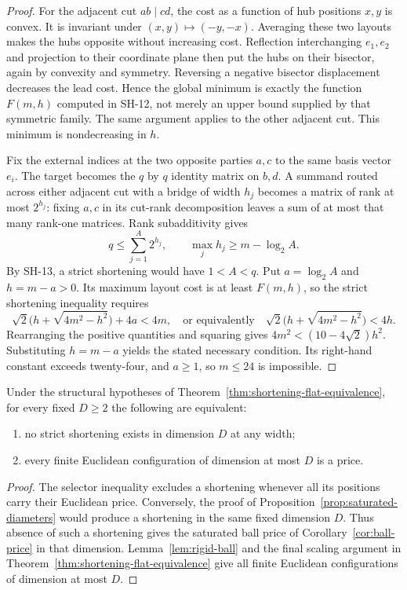 \begin{proof}
For the adjacent cut $ab\mid cd$, the cost as a function of hub
positions $x,y$ is convex.  It is invariant under
$(x,y)\mapsto(-y,-x)$.  Averaging these two layouts makes the hubs
opposite without increasing cost.  Reflection interchanging $e_1,e_2$
and projection to their coordinate plane then put the hubs on their
bisector, again by convexity and symmetry.  Reversing a negative
bisector displacement decreases the lead cost.  Hence the global
minimum is exactly the function $F(m,h)$ computed in SH-12, not merely
an upper bound supplied by that symmetric family.  The same argument
applies to the other adjacent cut.  This minimum is nondecreasing in
$h$.

Fix the external indices at the two opposite parties $a,c$ to the
same basis vector $e_i$.  The target becomes the $q$ by $q$ identity
matrix on $b,d$.  A summand routed across either adjacent cut with a
bridge of width $h_j$ becomes a matrix of rank at most $2^{h_j}$:
fixing $a,c$ in its cut-rank decomposition leaves a sum of at most
that many rank-one matrices.  Rank subadditivity gives
\[
 q\le\sum_{j=1}^A2^{h_j},\qquad
 \max_j h_j\ge m-\log_2 A.
\]
By SH-13, a strict shortening would have $1<A<q$.  Put
$a=\log_2 A$ and $h=m-a>0$.  Its maximum layout cost is at least
$F(m,h)$, so the strict shortening inequality requires
\[
 \sqrt2\bigl(h+\sqrt{4m^2-h^2}\bigr)+4a<4m,
 \quad\text{or equivalently}\quad
 \sqrt2\bigl(h+\sqrt{4m^2-h^2}\bigr)<4h.
\]
Rearranging the positive quantities and squaring gives
$4m^2<(10-4\sqrt2)h^2$.  Substituting $h=m-a$ yields the stated
necessary condition.  Its right-hand constant exceeds twenty-four,
and $a\ge1$, so $m\le24$ is impossible.
\end{proof}

\begin{corollary}
\label{cor:fixed-dimension}
Under the structural hypotheses of Theorem~\ref{thm:shortening-flat-equivalence},
for every fixed $D\ge2$ the following are equivalent:
\begin{enumerate}
\item no strict shortening exists in dimension $D$ at any width;
\item every finite Euclidean configuration of dimension at most $D$
is a price.
\end{enumerate}
\end{corollary}
\begin{proof}
The selector inequality excludes a shortening whenever all its
positions carry their Euclidean price.  Conversely, the proof of
Proposition~\ref{prop:saturated-diameters} would produce a shortening
in the same fixed dimension $D$.  Thus absence of such a shortening
gives the saturated ball price of Corollary~\ref{cor:ball-price} in
that dimension.  Lemma~\ref{lem:rigid-ball} and the final scaling
argument in Theorem~\ref{thm:shortening-flat-equivalence} give all
finite Euclidean configurations of dimension at most $D$.
\end{proof}

